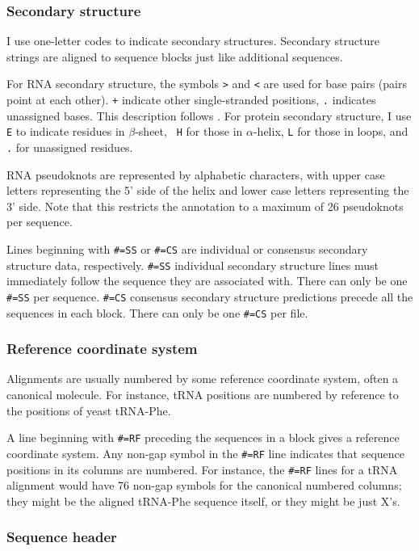 \subsubsection {Secondary structure}

I use one-letter codes to indicate secondary structures. Secondary
structure strings are aligned to sequence blocks just like additional
sequences.

For RNA secondary structure, the symbols \verb+>+ and \verb+<+ are
used for base pairs (pairs point at each other).  \verb-+- indicate
other single-stranded positions, {\tt .} indicates unassigned bases.
This description follows \cite{Konings89}.  For protein secondary
structure, I use {\tt E} to indicate residues in $\beta$-sheet, {\tt
H} for those in $\alpha$-helix, {\tt L} for those in loops, and {\tt
.} for unassigned residues.

RNA pseudoknots are represented by alphabetic characters, with upper
case letters representing the 5' side of the helix and lower case
letters representing the 3' side. Note that this restricts the
annotation to a maximum of 26 pseudoknots per sequence.

Lines beginning with \verb+#=SS+ or \verb+#=CS+ are individual or
consensus secondary structure data, respectively.  \verb+#=SS+
individual secondary structure lines must immediately follow the
sequence they are associated with.  There can only be one \verb+#=SS+
per sequence. \verb+#=CS+ consensus secondary structure predictions
precede all the sequences in each block. There can only be one
\verb+#=CS+ per file.

\subsubsection {Reference coordinate system}

Alignments are usually numbered by some reference coordinate system,
often a canonical molecule. For instance, tRNA positions are numbered
by reference to the positions of yeast tRNA-Phe.

A line beginning with \verb+#=RF+ preceding the sequences in a block
gives a reference coordinate system. Any non-gap symbol in the
\verb+#=RF+ line indicates that sequence positions in its columns are
numbered. For instance, the \verb+#=RF+ lines for a tRNA alignment
would have 76 non-gap symbols for the canonical numbered columns; they
might be the aligned tRNA-Phe sequence itself, or they might be just
X's.

\subsubsection {Sequence header}

